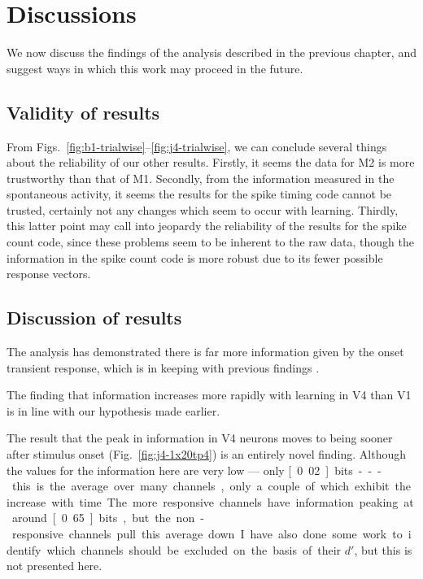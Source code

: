 \chapter{Discussions}

We now discuss the findings of the analysis described in the previous chapter, and suggest ways in which this work may proceed in the future.

\section{Validity of results}

From Figs.~\ref{fig:b1-trialwise}--\ref{fig:j4-trialwise}, we can conclude several things about the reliability of our other results.
Firstly, it seems the data for M2 is more trustworthy than that of M1.
Secondly, from the information measured in the spontaneous activity, it seems the results for the spike timing code cannot be trusted, certainly not any changes which seem to occur with learning.
Thirdly, this latter point may call into jeopardy the reliability of the results for the spike count code, since these problems seem to be inherent to the raw data, though the information in the spike count code is more robust due to its fewer possible response vectors.

\section{Discussion of results}

The analysis has demonstrated there is far more information given by the onset transient response, which is in keeping with previous findings \cite{Muller2001}.

The finding that information increases more rapidly with learning in V4 than V1 is in line with our hypothesis made earlier.

The result that the peak in information in V4 neurons moves to being sooner after stimulus onset (Fig.~\ref{fig:j4-1x20tp4}) is an entirely novel finding. Although the values for the information here are very low --- only \unit[0.02]{bits} --- this is the average over many channels, only a couple of which exhibit the increase with time. The more responsive channels have information peaking at around \unit[0.65]{bits}, but the non-responsive channels pull this average down. I have also done some work to identify which channels should be excluded on the basis of their $d'$, but this is not presented here.

